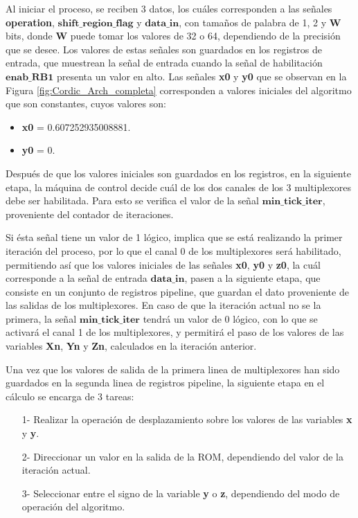 Al iniciar el proceso, se reciben 3 datos, los cuáles corresponden a las señales \textbf{operation}, $\textbf{shift\_region\_flag}$ y $\textbf{data\_in}$,  con tamaños de palabra de 1, 2 y \textbf{W} bits, donde \textbf{W} puede tomar los valores de 32 o 64, dependiendo de la precisión que se desee. Los valores de estas señales son guardados en los registros de entrada, que muestrean la señal de entrada cuando la señal de habilitación $\textbf{enab\_RB1}$ presenta un valor en alto. Las señales \textbf{x0} y \textbf{y0} que se observan en la Figura \ref{fig:Cordic_Arch_completa} corresponden a valores iniciales del algoritmo que son constantes, cuyos valores son:
\begin{itemize}
\item	\textbf{x0} = 0.607252935008881.
\item	\textbf{y0} = 0.
\end{itemize}

Después de que los valores iniciales son guardados en los registros, en la siguiente etapa, la máquina de control decide cuál de los dos canales de los 3 multiplexores debe ser habilitada. Para esto se verifica el valor de la señal $\textbf{min\_tick\_iter}$, proveniente del contador de iteraciones. 

Si ésta señal tiene un valor de 1 lógico, implica que se está realizando la primer iteración del proceso, por lo que el canal 0 de los multiplexores será habilitado, permitiendo así que los valores iniciales de las señales \textbf{x0}, \textbf{y0} y \textbf{z0}, la cuál corresponde a la señal de entrada $\textbf{data\_in}$, pasen a la siguiente etapa, que consiste en un conjunto de registros pipeline, que guardan el dato proveniente de las salidas de los multiplexores. En caso de que la iteración actual no se la primera, la señal $\textbf{min\_tick\_iter}$ tendrá un valor de 0 lógico, con lo que se activará el canal 1 de los multiplexores, y permitirá el paso de los valores de las variables \textbf{Xn}, \textbf{Yn} y \textbf{Zn}, calculados en la iteración anterior.

Una vez que los valores de salida de la primera linea de multiplexores han sido guardados en la segunda linea de registros pipeline, la siguiente etapa en el cálculo se encarga de 3 tareas:
\begin{itemize}
\item[1-]	Realizar la operación de desplazamiento sobre los valores de las variables \textbf{x} y \textbf{y}.
\item[2-]	Direccionar un valor en la salida de la ROM, dependiendo del valor de la iteración actual.
\item[3-]	Seleccionar entre el signo de la variable \textbf{y} o \textbf{z}, dependiendo del modo de operación del algoritmo.
\end{itemize}

